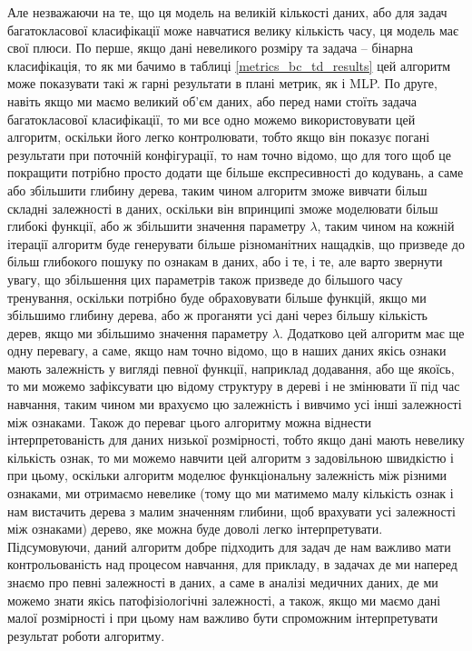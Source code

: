 Але незважаючи на те, що ця модель на великій кількості даних, або для задач багатокласової класифікації може навчатися велику кількість часу, ця модель має свої плюси. По перше, якщо дані невеликого розміру та задача -- бінарна класифікація, то як ми бачимо в таблиці \ref{metrics_bc_td_results} цей алгоритм може показувати такі ж гарні результати в плані метрик, як і MLP. По друге, навіть якщо ми маємо великий об'єм даних, або перед нами стоїть задача багатокласової класифікації, то ми все одно можемо використовувати цей алгоритм, оскільки його легко контролювати, тобто якщо він показує погані результати при поточній конфігурації, то нам точно відомо, що для того щоб це покращити потрібно просто додати ще більше експресивності до кодувань, а саме або збільшити глибину дерева, таким чином алгоритм зможе вивчати більш складні залежності в даних, оскільки він впринципі зможе моделювати більш глибокі функції, або ж збільшити значення параметру $\lambda$, таким чином на кожній ітерації алгоритм буде генерувати більше різноманітних нащадків, що призведе до більш глибокого пошуку по ознакам в даних, або і те, і те, але варто звернути увагу, що збільшення цих параметрів також призведе до більшого часу тренування, оскільки потрібно буде обраховувати більше функцій, якщо ми збільшимо глибину дерева, або ж проганяти усі дані через більшу кількість дерев, якщо ми збільшимо значення параметру $\lambda$. Додатково цей алгоритм має ще одну перевагу, а саме, якщо нам точно відомо, що в наших даних якісь ознаки мають залежність у вигляді певної функції, наприклад додавання, або ще якоїсь, то ми можемо зафіксувати цю відому структуру в дереві і не змінювати її під час навчання, таким чином ми врахуємо цю залежність і вивчимо усі інші залежності між ознаками. Також до переваг цього алгоритму можна віднести інтерпретованість для даних низької розмірності, тобто якщо дані мають невелику кількість ознак, то ми можемо навчити цей алгоритм з задовільною швидкістю і при цьому, оскільки алгоритм моделює функціональну залежність між різними ознаками, ми отримаємо невелике (тому що ми матимемо малу кількість ознак і нам вистачить дерева з малим значенням глибини, щоб врахувати усі залежності між ознаками) дерево, яке можна буде доволі легко інтерпретувати. Підсумовуючи, даний алгоритм добре підходить для задач де нам важливо мати контрольованість над процесом навчання, для прикладу, в задачах де ми наперед знаємо про певні залежності в даних, а саме в аналізі медичних даних, де ми можемо знати якісь патофізіологічні залежності, а також, якщо ми маємо дані малої розмірності і при цьому нам важливо бути спроможним інтерпретувати результат роботи алгоритму.

